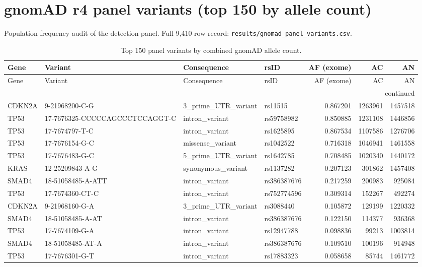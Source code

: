 \section{gnomAD r4 panel variants (top 150 by allele count)}
Population-frequency audit of the detection panel. Full 9{,}410-row record: \texttt{results/gnomad\_panel\_variants.csv}.
\begin{footnotesize}\begin{longtable}{llllrrr}
\caption{Top 150 panel variants by combined gnomAD allele count.}\\ \hline\hline
Gene & Variant & Consequence & rsID & AF (exome) & AC & AN \\ \hline \endfirsthead
\hline\hline Gene & Variant & Consequence & rsID & AF (exome) & AC & AN \\ \hline \endhead
\hline \multicolumn{7}{r}{continued}\\ \endfoot \hline\hline \endlastfoot
CDKN2A & 9-21968200-C-G & 3\_prime\_UTR\_variant & rs11515 & 0.867201 & 1263961 & 1457518 \\
TP53 & 17-7676325-CCCCCAGCCCTCCAGGT-C & intron\_variant & rs59758982 & 0.850885 & 1231108 & 1446856 \\
TP53 & 17-7674797-T-C & intron\_variant & rs1625895 & 0.867534 & 1107586 & 1276706 \\
TP53 & 17-7676154-G-C & missense\_variant & rs1042522 & 0.716318 & 1046941 & 1461558 \\
TP53 & 17-7676483-G-C & 5\_prime\_UTR\_variant & rs1642785 & 0.708485 & 1020340 & 1440172 \\
KRAS & 12-25209843-A-G & synonymous\_variant & rs1137282 & 0.207123 & 301862 & 1457408 \\
SMAD4 & 18-51058485-A-ATT & intron\_variant & rs386387676 & 0.217259 & 200983 & 925084 \\
TP53 & 17-7674360-CT-C & intron\_variant & rs752774596 & 0.309314 & 152267 & 492274 \\
CDKN2A & 9-21968160-G-A & 3\_prime\_UTR\_variant & rs3088440 & 0.105872 & 129199 & 1220332 \\
SMAD4 & 18-51058485-A-AT & intron\_variant & rs386387676 & 0.122150 & 114377 & 936368 \\
TP53 & 17-7674109-G-A & intron\_variant & rs12947788 & 0.098836 & 99213 & 1003814 \\
SMAD4 & 18-51058485-AT-A & intron\_variant & rs386387676 & 0.109510 & 100196 & 914948 \\
TP53 & 17-7676301-G-T & intron\_variant & rs17883323 & 0.058658 & 85744 & 1461772 \\

\end{longtable}
\end{footnotesize}

